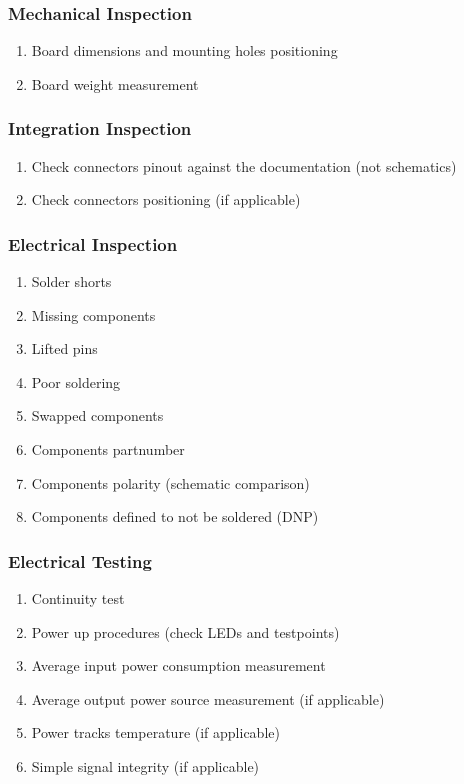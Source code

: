 \subsubsection{Mechanical Inspection}
\begin{enumerate} \setlength\itemsep{-0.3em}
    \item Board dimensions and mounting holes positioning
    \item Board weight measurement
\end{enumerate}

\subsubsection{Integration Inspection}
\begin{enumerate} \setlength\itemsep{-0.3em}
    \item Check connectors pinout against the documentation (not schematics)
    \item Check connectors positioning (if applicable)
\end{enumerate}

\subsubsection{Electrical Inspection}
\begin{enumerate} \setlength\itemsep{-0.3em}
    \item Solder shorts
    \item Missing components
    \item Lifted pins
    \item Poor soldering
    \item Swapped components
    \item Components partnumber
    \item Components polarity (schematic comparison)
    \item Components defined to not be soldered (DNP)
\end{enumerate}

\subsubsection{Electrical Testing}
\begin{enumerate} \setlength\itemsep{-0.3em}
    \item Continuity test
    \item Power up procedures (check LEDs and testpoints)
    \item Average input power consumption measurement
    \item Average output power source measurement (if applicable) 
    \item Power tracks temperature (if applicable)
    \item Simple signal integrity (if applicable)
\end{enumerate}


